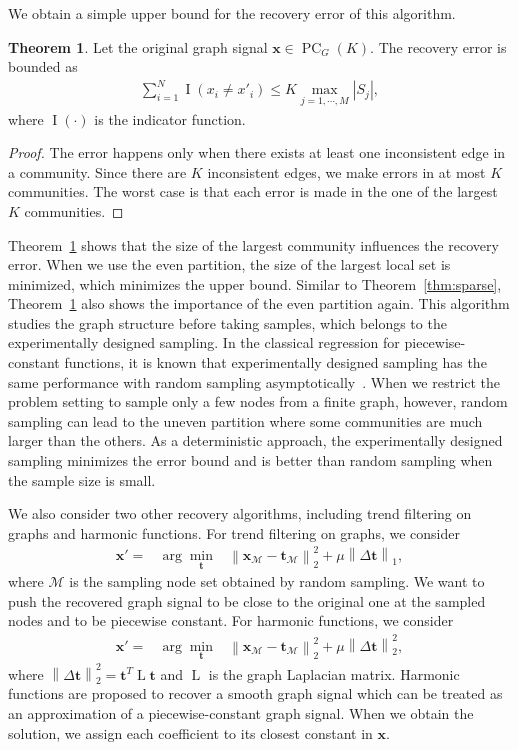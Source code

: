 \documentclass[journal,twocolumn,10pt]{IEEEtran}
\theoremstyle{definition}
\newtheorem{myThm}{Theorem}
\DeclareMathOperator{\Id}{I}
\def\x{\mathbf{x}}
\def\t{\mathbf{t}}
\def\M{\mathcal{M}}
\DeclareMathOperator{\LL}{L}
\DeclareMathOperator{\PC}{PC}
\begin{document}
We obtain a simple upper bound for the recovery error of this algorithm.
\begin{myThm}
\label{thm:recovery_err}
Let the original graph signal $\x \in \PC_G(K)$.
The recovery error is bounded as
\begin{eqnarray*}
\sum_{i=1}^{N} \Id ( x_i \neq x'_i ) \leq K \max_{j = 1, \cdots, M} | S_j |,
\end{eqnarray*}
where $\Id (\cdot)$ is the indicator function.
\end{myThm}
\begin{proof}
The error happens only when there exists at least one inconsistent edge in a community. Since there are $K$ inconsistent edges, we make errors in at most $K$ communities. The worst case is that each error is made in the one of the largest $K$ communities.
\end{proof}
Theorem~\ref{thm:recovery_err} shows that the size of the largest community influences the recovery error.  When we use the even partition, the size of the largest local set is minimized, which minimizes the upper bound. Similar to Theorem~\ref{thm:sparse}, Theorem~\ref{thm:recovery_err} also shows the importance of the even partition again. This algorithm studies the graph structure before taking samples, which belongs to the experimentally designed sampling. In the classical regression for piecewise-constant functions, it is known that experimentally designed sampling has the same performance with random sampling asymptotically~\cite{CastroWN:05}. When we restrict the problem setting to sample only a few nodes from a finite graph, however, random sampling can lead to the uneven partition where some communities are much larger than the others. As a deterministic approach, the experimentally designed sampling minimizes the error bound and is better than random sampling when the sample size is small.


We also consider two other recovery algorithms, including trend filtering on graphs and harmonic functions. For trend filtering on graphs, we consider
\begin{eqnarray*}
\label{eq:trend_filtering}
   \x' =  &  \arg \min_{\t} & \left\| \x_\M - \t_\M  \right\|_2^2 + \mu \left\| \Delta \t \right\|_1,
\end{eqnarray*}
where $\M$ is the sampling node set obtained by random sampling. We want to push the recovered graph signal to be close to the original one at the sampled nodes and to be piecewise constant. For harmonic functions, we consider
\begin{eqnarray*}
\label{eq:trend_filtering}
   \x' =  &  \arg \min_{\t} & \left\| \x_\M - \t_\M  \right\|_2^2 + \mu \left\| \Delta \t \right\|_2^2,
\end{eqnarray*}
where $\left\| \Delta \t \right\|_2^2 = \t^T \LL \t$ and $\LL$ is the graph Laplacian matrix. Harmonic functions are proposed to recover a smooth graph signal which can be treated as an approximation of a piecewise-constant graph signal. When we obtain the solution, we assign each coefficient to its closest constant in $\x$.
\end{document}
